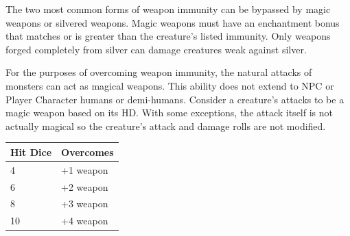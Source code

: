 \begin{multicols}{2}
The two most common forms of weapon immunity can be bypassed by magic weapons or silvered weapons.  Magic weapons must have an enchantment bonus that matches or is greater than the creature's listed immunity.  Only weapons forged completely from silver can damage creatures weak against silver.

For the purposes of overcoming weapon immunity, the natural attacks of monsters can act as magical weapons. This ability does not extend to NPC or Player Character humans or demi-humans.  Consider a creature's attacks to be a magic weapon based on its HD.  With some exceptions, the attack itself is not actually magical so the creature's attack and damage rolls are not modified.

\noindent
\begin{minipage}{\columnwidth}

\label{overcomingimmunity}
\noindent
\begin{tabular}{|p{}|p{}|}
\hline
Hit Dice	& Overcomes \\
\hline\hline
\rowcolor[gray]{.9}4	& +1 weapon \\
6	& +2 weapon \\
\rowcolor[gray]{.9}8	& +3 weapon \\
10	& +4 weapon \\
\hline
\end{tabular}

\end{minipage}

\end{multicols}

